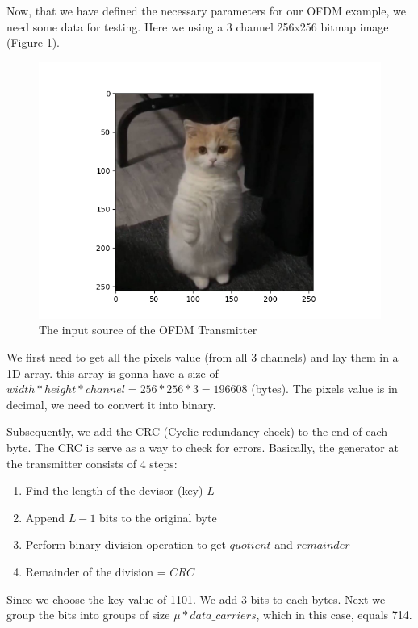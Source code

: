 Now, that we have defined the necessary parameters for our OFDM example, we need some data for testing. Here we using a 3 channel 256x256 bitmap image (Figure \ref{input}).

\begin{figure}[htbp]
    \centering
    \includegraphics[width=\textwidth]{../Source/results/input}
    \caption{The input source of the OFDM Transmitter}
    \label{input}
\end{figure}

We first need to get all the pixels value (from all 3 channels) and lay them in a 1D array. this array is gonna have a size of $width*height*channel = 256*256*3 = 196608$ (bytes). The pixels value is in decimal, we need to convert it into binary.

Subsequently, we add the CRC (Cyclic redundancy check) \cite{crc} to the end of each byte. The CRC is serve as a way to check for errors. Basically, the  generator at the transmitter consists of 4 steps:

\begin{enumerate}
    \item Find the length of the devisor (key) $L$
    \item Append $L-1$ bits to the original byte
    \item Perform binary division operation to get $quotient$ and $remainder$
    \item Remainder of the division = $CRC$
\end{enumerate}

Since we choose the key value of 1101. We add 3 bits to each bytes. Next we group the bits into groups of size $\mu * data\_carriers$, which in this case, equals 714.

